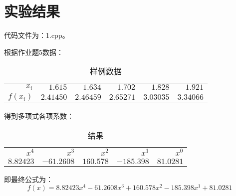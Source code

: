 \documentclass[hyperref,UTF8,c5size]{ctexart}
\begin{document}
\section{实验结果}
        代码文件为：1.cpp。

        根据作业题5数据：
        \begin{table}[H]
                \centering
                \caption{样例数据}
	            \label{tab:data}
                \begin{tabular}{rrrrrr}
                \hline
                $x_i$ & $1.615$ & $1.634$ & $1.702$ & $1.828$ & $1.921$ \\
                $f(x_i)$ & $2.41450$ & $2.46459$ & $2.65271$ & $3.03035$ & $3.34066$ \\
                \hline
                \end{tabular}
        \end{table}

        得到多项式各项系数：
        \begin{table}[H]
                \centering
                \caption{结果}
	            \label{tab:data}
                \begin{tabular}{rrrrr}
                \hline
                $x^4$ & $x^3$ & $x^2$ & $x^1$ & $x^0$ \\
                $8.82423$ & $-61.2608$ & $160.578$ & $-185.398$ & $81.0281$ \\
                \hline
                \end{tabular}
        \end{table}

        即最终公式为：
        \begin{equation}\label{eq:result}
                f(x) = 8.82423x^4 - 61.2608x^3 + 160.578x^2 - 185.398x^1 + 81.0281
        \end{equation}
        
\end{document}
